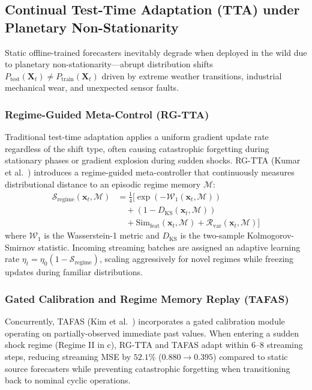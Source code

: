 \subsection{Continual Test-Time Adaptation (TTA) under Planetary Non-Stationarity}
\label{sec:continual_tta}
Static offline-trained forecasters inevitably degrade when deployed in the wild due to planetary non-stationarity—abrupt distribution shifts $P_{\text{test}}(\mathbf{X}_t) \neq P_{\text{train}}(\mathbf{X}_t)$ driven by extreme weather transitions, industrial mechanical wear, and unexpected sensor faults.

\subsubsection{Regime-Guided Meta-Control (RG-TTA)}
Traditional test-time adaptation applies a uniform gradient update rate regardless of the shift type, often causing catastrophic forgetting during stationary phases or gradient explosion during sudden shocks. RG-TTA (Kumar et al.~\cite{Kumar2026RGTTA}) introduces a regime-guided meta-controller that continuously measures distributional distance to an episodic regime memory $\mathcal{M}$:
\begin{equation}
\begin{aligned}
    \mathcal{S}_{\text{regime}}(\mathbf{x}_t, \mathcal{M}) &= \frac{1}{4} \Big[ \exp(-\mathcal{W}_1(\mathbf{x}_t, \mathcal{M})) \\
    &\quad + (1 - D_{\text{KS}}(\mathbf{x}_t, \mathcal{M})) \\
    &\quad + \text{Sim}_{\text{feat}}(\mathbf{x}_t, \mathcal{M}) + \mathcal{R}_{\text{var}}(\mathbf{x}_t, \mathcal{M}) \Big]
\end{aligned}
\end{equation}
where $\mathcal{W}_1$ is the Wasserstein-1 metric and $D_{\text{KS}}$ is the two-sample Kolmogorov-Smirnov statistic. Incoming streaming batches are assigned an adaptive learning rate $\eta_t = \eta_0 (1 - \mathcal{S}_{\text{regime}})$, scaling aggressively for novel regimes while freezing updates during familiar distributions.

\subsubsection{Gated Calibration and Regime Memory Replay (TAFAS)}
Concurrently, TAFAS (Kim et al.~\cite{Kim2025TAFAS}) incorporates a gated calibration module operating on partially-observed immediate past values. When entering a sudden shock regime (Regime II in c), RG-TTA and TAFAS adapt within 6--8 streaming steps, reducing streaming MSE by $52.1\%$ ($0.880 \to 0.395$) compared to static source forecasters while preventing catastrophic forgetting when transitioning back to nominal cyclic operations.

